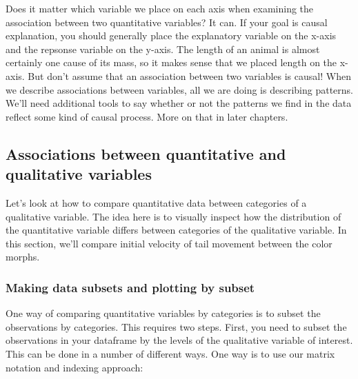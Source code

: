 \documentclass[
]{book}
\newenvironment{Shaded}{\begin{snugshade}}{\end{snugshade}}
\newcommand{\CommentTok}[1]{\textcolor[rgb]{0.56,0.35,0.01}{\textit{#1}}}
\newcommand{\FunctionTok}[1]{\textcolor[rgb]{0.13,0.29,0.53}{\textbf{#1}}}
\newcommand{\NormalTok}[1]{#1}
\newcommand{\OtherTok}[1]{\textcolor[rgb]{0.56,0.35,0.01}{#1}}
\newcommand{\SpecialCharTok}[1]{\textcolor[rgb]{0.81,0.36,0.00}{\textbf{#1}}}
\newcommand{\StringTok}[1]{\textcolor[rgb]{0.31,0.60,0.02}{#1}}
\begin{document}
Does it matter which variable we place on each axis when examining the association between two quantitative variables? It can. If your goal is causal explanation, you should generally place the explanatory variable on the x-axis and the repsonse variable on the y-axis. The length of an animal is almost certainly one cause of its mass, so it makes sense that we placed length on the x-axis. But don't assume that an association between two variables is causal! When we describe associations between variables, all we are doing is describing patterns. We'll need additional tools to say whether or not the patterns we find in the data reflect some kind of causal process. More on that in later chapters.

\subsection{Associations between quantitative and qualitative variables}\label{associations-between-quantitative-and-qualitative-variables}

Let's look at how to compare quantitative data between categories of a qualitative variable. The idea here is to visually inspect how the distribution of the quantitative variable differs between categories of the qualitative variable. In this section, we'll compare initial velocity of tail movement between the color morphs.

\subsubsection{Making data subsets and plotting by subset}\label{making-data-subsets-and-plotting-by-subset}

One way of comparing quantitative variables by categories is to subset the observations by categories. This requires two steps. First, you need to subset the observations in your dataframe by the levels of the qualitative variable of interest. This can be done in a number of different ways. One way is to use our matrix notation and indexing approach:

\begin{Shaded}
\end{Shaded}
\end{document}
